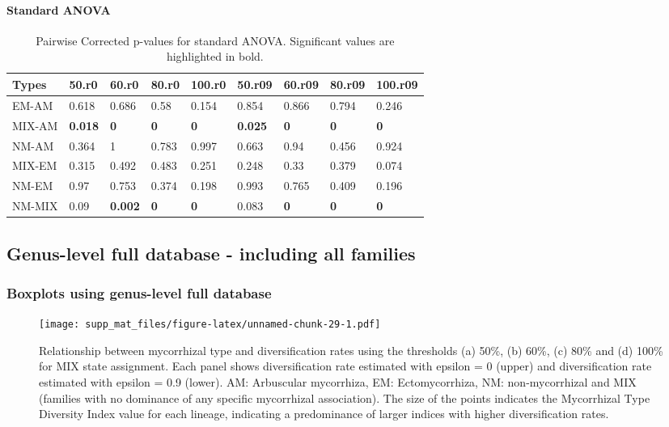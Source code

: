 \documentclass[]{article}
\let\oldparagraph\paragraph
\renewcommand{\paragraph}[1]{\oldparagraph{#1}\mbox{}}
\begin{document}
\hypertarget{standard-anova-5}{%
\paragraph{Standard ANOVA}\label{standard-anova-5}}

\begin{table}[H]

\caption{\label{tab:unnamed-chunk-27}Pairwise Corrected p-values for standard ANOVA. Significant values are highlighted in bold.}
\centering
\begin{tabular}{l|l|l|l|l|l|l|l|l}
\hline
Types & 50.r0 & 60.r0 & 80.r0 & 100.r0 & 50.r09 & 60.r09 & 80.r09 & 100.r09\\
\hline
EM-AM & 0.618 & 0.686 & 0.58 & 0.154 & 0.854 & 0.866 & 0.794 & 0.246\\
\hline
MIX-AM & \textbf{0.018} & \textbf{0} & \textbf{0} & \textbf{0} & \textbf{0.025} & \textbf{0} & \textbf{0} & \textbf{0}\\
\hline
NM-AM & 0.364 & 1 & 0.783 & 0.997 & 0.663 & 0.94 & 0.456 & 0.924\\
\hline
MIX-EM & 0.315 & 0.492 & 0.483 & 0.251 & 0.248 & 0.33 & 0.379 & 0.074\\
\hline
NM-EM & 0.97 & 0.753 & 0.374 & 0.198 & 0.993 & 0.765 & 0.409 & 0.196\\
\hline
NM-MIX & 0.09 & \textbf{0.002} & \textbf{0} & \textbf{0} & 0.083 & \textbf{0} & \textbf{0} & \textbf{0}\\
\hline
\end{tabular}
\end{table}

\hypertarget{genus-level-full-database---including-all-families}{%
\subsection{Genus-level full database - including all
families}\label{genus-level-full-database---including-all-families}}

\hypertarget{boxplots-using-genus-level-full-database}{%
\subsubsection{Boxplots using genus-level full
database}\label{boxplots-using-genus-level-full-database}}

\begin{figure}
\centering
\texttt{[image: supp\_mat\_files/figure-latex/unnamed-chunk-29-1.pdf]}
\caption{Relationship between mycorrhizal type and diversification rates
using the thresholds (a) 50\%, (b) 60\%, (c) 80\% and (d) 100\% for MIX
state assignment. Each panel shows diversification rate estimated with
epsilon = 0 (upper) and diversification rate estimated with epsilon =
0.9 (lower). AM: Arbuscular mycorrhiza, EM: Ectomycorrhiza, NM:
non-mycorrhizal and MIX (families with no dominance of any specific
mycorrhizal association). The size of the points indicates the
Mycorrhizal Type Diversity Index value for each lineage, indicating a
predominance of larger indices with higher diversification rates.}
\end{figure}
\end{document}
